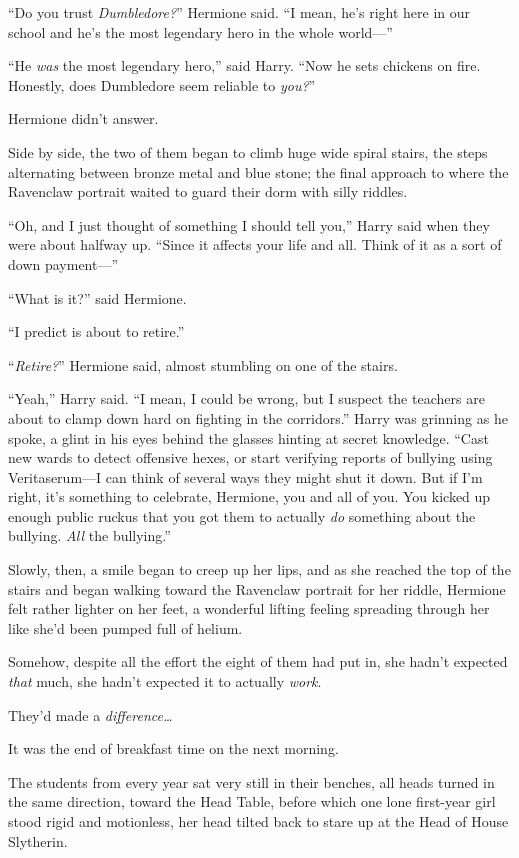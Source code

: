 “Do you trust \emph{Dumbledore?}” Hermione said. “I mean, he’s right here in our school and he’s the most legendary hero in the whole world—”

“He \emph{was} the most legendary hero,” said Harry. “Now he sets chickens on fire. Honestly, does Dumbledore seem reliable to \emph{you?}”

Hermione didn’t answer.

Side by side, the two of them began to climb huge wide spiral stairs, the steps alternating between bronze metal and blue stone; the final approach to where the Ravenclaw portrait waited to guard their dorm with silly riddles.

“Oh, and I just thought of something I should tell you,” Harry said when they were about halfway up. “Since it affects your life and all. Think of it as a sort of down payment—”

“What is it?” said Hermione.

“I predict \SPHEW{} is about to retire.”

“\emph{Retire?}” Hermione said, almost stumbling on one of the stairs.

“Yeah,” Harry said. “I mean, I could be wrong, but I suspect the teachers are about to clamp down hard on fighting in the corridors.” Harry was grinning as he spoke, a glint in his eyes behind the glasses hinting at secret knowledge. “Cast new wards to detect offensive hexes, or start verifying reports of bullying using Veritaserum—I can think of several ways they might shut it down. But if I’m right, it’s something to celebrate, Hermione, you and all of you. You kicked up enough public ruckus that you got them to actually \emph{do} something about the bullying. \emph{All} the bullying.”

Slowly, then, a smile began to creep up her lips, and as she reached the top of the stairs and began walking toward the Ravenclaw portrait for her riddle, Hermione felt rather lighter on her feet, a wonderful lifting feeling spreading through her like she’d been pumped full of helium.

Somehow, despite all the effort the eight of them had put in, she hadn’t expected \emph{that} much, she hadn’t expected it to actually \emph{work}.

They’d made a \emph{difference…}

\later

It was the end of breakfast time on the next morning.

The students from every year sat very still in their benches, all heads turned in the same direction, toward the Head Table, before which one lone first-year girl stood rigid and motionless, her head tilted back to stare up at the Head of House Slytherin.

